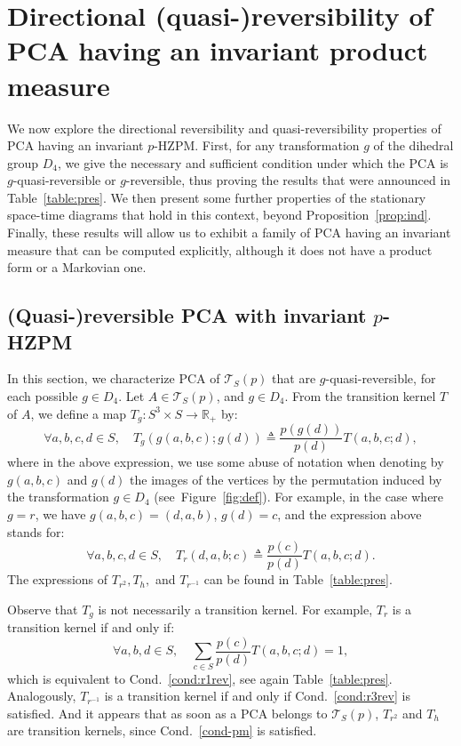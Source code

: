 \documentclass[10pt]{amsart}
\theoremstyle{definition}\newtheorem{defi}[theo]{Definition}\newtheorem{rema}[theo]{Remark}\newtheorem{exam}[theo]{Example}\newtheorem{exem}[theo]{Example}\newtheorem{nota}[theo]{Notation}
\newcounter{a}
\newcommand{\Cond}{Cond.}
\newcommand{\triang}[2]{\mathcal{T}_{#1} \left(#2 \right)}
\newcommand{\isdef}{\triangleq}
\let\oldforall\forall
\renewcommand*{\forall}{\mathrel{\oldforall}}
\begin{document}
\section{Directional (quasi-)reversibility of PCA having an invariant product measure} \label{sec:rqrPCA}

We now explore the directional reversibility and quasi-reversibility properties of PCA having an invariant $p$-HZPM. First, for any transformation $g$ of the dihedral group $D_4$, we give the necessary and sufficient condition under which the PCA is $g$-quasi-reversible or $g$-reversible, thus proving the results that were announced in Table~\ref{table:pres}. We then present some further properties of the stationary space-time diagrams that hold in this context, beyond Proposition~\ref{prop:ind}. Finally, these results will allow us to exhibit a family of PCA having an invariant measure that can be computed explicitly, although it does not have a product form or a Markovian one.

\subsection{(Quasi-)reversible PCA with invariant \texorpdfstring{$p$}{p}-HZPM}\label{sec:qrPCAinv}
In this section, we characterize PCA of $\triang{S}{p}$ that are $g$-quasi-reversible, for each possible $g\in D_4$. Let $A\in\triang{S}{p}$, and $g\in D_4$. From the transition kernel $T$ of $A$, we define a map $T_g: S^3 \times S\to \mathbb R_+$ by:
\[
\forall a,b,c,d\in S, \quad T_g(g(a,b,c);g(d))\isdef\frac{p(g(d))}{p(d)}T(a,b,c;d),
\]
where in the above expression, we use some abuse of notation when denoting by $g(a,b,c)$ and $g(d)$ the images of the vertices by the permutation induced by the transformation $g\in D_4$ (see~Figure~\ref{fig:def}). For example, in the case where $g=r$, we have $g(a,b,c)=(d,a,b)$, $g(d)=c$, and the expression above stands for:
\[
\forall a,b,c,d\in S, \quad T_r(d,a,b;c)\isdef\frac{p(c)}{p(d)}T(a,b,c;d).
\]
The expressions of $T_{r^2}, T_{h},$ and $T_{r^{-1}}$ can be found in Table~\ref{table:pres}.

Observe that $T_g$ is not necessarily a transition kernel. For example, $T_r$ is a transition kernel if and only if:
\[
\forall a,b,d\in S, \quad \sum_{c\in S} \frac{p(c)}{p(d)}T(a,b,c;d)=1,
\]
which is equivalent to \Cond~\ref{cond:r1rev}, see again Table~\ref{table:pres}. Analogously, $T_{r^{-1}}$ is a transition kernel if and only if \Cond~\ref{cond:r3rev} is satisfied. And it appears that as soon as a PCA belongs to $\triang{S}{p}$, $T_{r^2}$ and $T_h$ are transition kernels, since \Cond~\ref{cond-pm} is satisfied.
\end{document}
